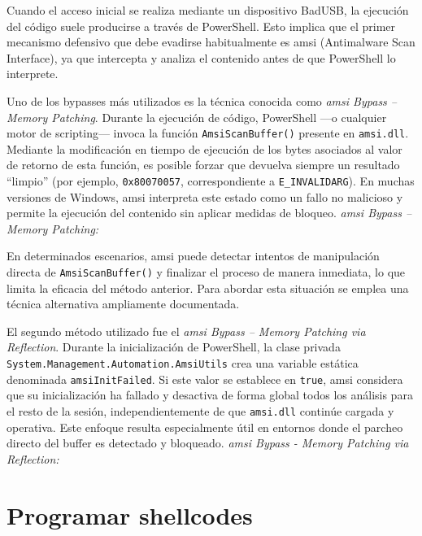 Cuando el acceso inicial se realiza mediante un dispositivo BadUSB, la ejecución del código suele producirse a través de PowerShell. Esto implica que el primer mecanismo defensivo que debe evadirse habitualmente es \acrshort{amsi} (Antimalware Scan Interface), ya que intercepta y analiza el contenido antes de que PowerShell lo interprete.

Uno de los bypasses más utilizados es la técnica conocida como \textit{\acrshort{amsi} Bypass – Memory Patching}. Durante la ejecución de código, PowerShell —o cualquier motor de scripting— invoca la función \texttt{AmsiScanBuffer()} presente en \texttt{amsi.dll}. Mediante la modificación en tiempo de ejecución de los bytes asociados al valor de retorno de esta función, es posible forzar que devuelva siempre un resultado “limpio” (por ejemplo, \texttt{0x80070057}, correspondiente a \texttt{E\_INVALIDARG}). En muchas versiones de Windows, \acrshort{amsi} interpreta este estado como un fallo no malicioso y permite la ejecución del contenido sin aplicar medidas de bloqueo. \textit{\acrshort{amsi} Bypass – Memory Patching: \cite{amsi-bypass-patching}}

En determinados escenarios, \acrshort{amsi} puede detectar intentos de manipulación directa de \texttt{AmsiScanBuffer()} y finalizar el proceso de manera inmediata, lo que limita la eficacia del método anterior. Para abordar esta situación se emplea una técnica alternativa ampliamente documentada.

El segundo método utilizado fue el \textit{\acrshort{amsi} Bypass – Memory Patching via Reflection}. Durante la inicialización de PowerShell, la clase privada \\ \texttt{System.Management.Automation.AmsiUtils} crea una variable estática denominada \texttt{amsiInitFailed}. Si este valor se establece en \texttt{true}, \acrshort{amsi} considera que su inicialización ha fallado y desactiva de forma global todos los análisis para el resto de la sesión, independientemente de que \texttt{amsi.dll} continúe cargada y operativa. Este enfoque resulta especialmente útil en entornos donde el parcheo directo del buffer es detectado y bloqueado. \textit{\acrshort{amsi} Bypass - Memory Patching via Reflection: \cite{amsi-bypass-reflection}}


\section{Programar shellcodes} \label{sec:shellcodes}
\label{sec:shellcode}

